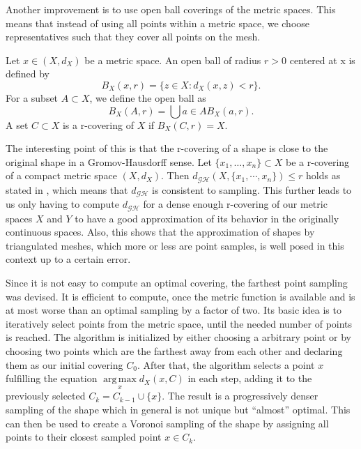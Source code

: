 Another improvement is to use open ball coverings of the metric spaces.
This means that instead of using all points within a metric space, we choose representatives such that they cover all points on the mesh.
\begin{mydef}
	Let $x \in (X,d_X)$ be a metric space. An open ball of radius $r > 0$ centered at x is defined by
	$$B_X(x,r) = \{z\in X:d_X(x,z) < r\}.$$
	For a subset $A \subset X$, we define the open ball as
	$$B_X(A,r) = \bigcup{a\in A} B_X(a,r).$$
	A set $C\subset X$ is a r-covering of $X$ if $B_X(C,r) = X$.
\end{mydef}
The interesting point of this is that the r-covering of a shape is close to the original shape in a Gromov-Hausdorff sense.
Let $\{x_1,\ldots,x_n\}\subset X$ be a r-covering of a compact metric space $(X,d_X)$.
Then $d_\mathcal{GH}(X,\{x_1,\cdots,x_n\}) \le r$ holds as stated in \cite{bronstein2008numerical}, which means that $d_\mathcal{GH}$ is consistent to sampling.
This further leads to us only having to compute $d_\mathcal{GH}$ for a dense enough r-covering of our metric spaces $X$ and $Y$ to have a good approximation of its behavior in the originally continuous spaces.
Also, this shows that the approximation of shapes by triangulated meshes, which more or less are point samples, is well posed in this context up to a certain error.

Since it is not easy to compute an optimal covering, the farthest point sampling was devised.
It is efficient to compute, once the metric function is available and is at most worse than an optimal sampling by a factor of two.
Its basic idea is to iteratively select points from the metric space, until the needed number of points is reached.
The algorithm is initialized by either choosing a arbitrary point or by choosing two points which are the farthest away from each other and declaring them as our initial covering $C_0$.
After that, the algorithm selects a point $x$ fulfilling the equation $\underset{x}{\operatorname{arg\,max}} d_X(x,C)$ in each step, adding it to the previously selected $C_k = C_{k-1} \cup \{x\}$.
The result is a progressively denser sampling of the shape which in general is not unique but ``almost'' optimal.
This can then be used to create a Voronoi sampling of the shape by assigning all points to their closest sampled point $x \in C_k$.
